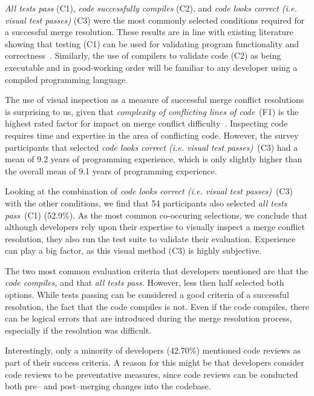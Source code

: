 \textit{All tests pass} (C1), \textit{code successfully compiles} (C2), and \textit{code looks correct (i.e. visual test passes)} (C3) were the most commonly selected conditions required for a successful merge resolution.
These results are in line with existing literature showing that testing (C1) can be used for validating program functionality and correctness~\cite{beizer1984software,tian2005software}. %
Similarly, the use of compilers to validate code (C2) as being executable and in good-working order will be familiar to any developer using a compiled programming language.

The use of visual inspection as a measure of successful merge conflict resolutions is surprising to us, given that \textit{complexity of conflicting lines of code}~(F1) is the highest rated factor for impact on merge conflict difficulty~\cite{mckee2017software}.
Inspecting code requires time and expertise in the area of conflicting code.
However, the survey participants that selected \textit{code looks correct (i.e. visual test passes)}~(C3) had a mean of 9.2 years of programming experience, which is only slightly higher than the overall mean of 9.1 years of programming experience.

Looking at the combination of \textit{code looks correct (i.e. visual test passes)}~(C3) with the other conditions, we find that 54 participants also selected \textit{all tests pass}~(C1) (52.9\%).
As the most common co-occuring selections, we conclude that although developers rely upon their expertise to visually inspect a merge conflict resolution, they also run the test suite to validate their evaluation.
Experience can play a big factor, as this visual method (C3) is highly subjective.

The two most common evaluation criteria that developers mentioned are that the \emph{code compiles,} and that \emph{all tests pass.}
However, less then half selected both options.
While tests passing can be considered a good criteria of a successful resolution, the fact that the code compiles is not.
Even if the code compiles, there can be logical errors that are introduced during the merge resolution process, especially if the resolution was difficult.

Interestingly, only a minority of developers (42.70\%) mentioned code reviews as part of their success criteria.
A reason for this might be that developers consider code reviews to be preventative measures, since code reviews can be conducted both pre-- and post--merging changes into the codebase.

